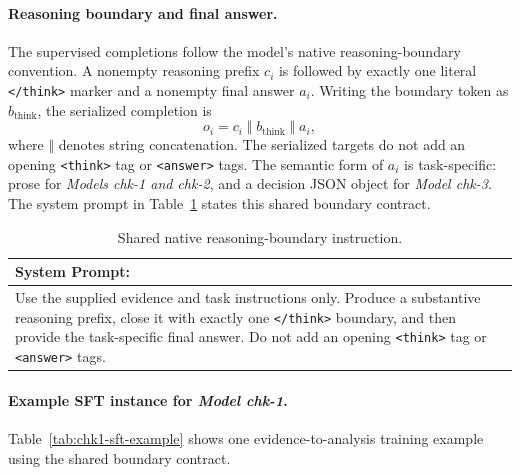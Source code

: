 \paragraph*{Reasoning boundary and final answer.}
The supervised completions follow the model's native reasoning-boundary
convention. A nonempty reasoning prefix $c_i$ is followed by exactly one
literal \texttt{</think>} marker and a nonempty final
answer $a_i$. Writing the boundary token as $b_{\mathrm{think}}$, the
serialized completion is
\begin{equation*}
    o_i=c_i\;\Vert\;b_{\mathrm{think}}\;\Vert\;a_i,
\end{equation*}
where $\Vert$ denotes string concatenation. The serialized targets do not add
an opening \texttt{<think>} tag or \texttt{<answer>} tags. The semantic form
of $a_i$ is task-specific: prose for \textit{Models chk-1 and chk-2},
and a decision JSON object for \textit{Model chk-3}. The system prompt in
Table~\ref{tab:ch2:system_prompt} states this shared boundary contract.


\begin{table}[htbp]
    \centering
    \footnotesize
    \begin{tabular}{@{}p{\textwidth}@{}}
    \toprule
    \textbf{System Prompt:} \\
    \midrule
      Use the supplied evidence and task instructions only. Produce a substantive reasoning prefix, close it with exactly one \texttt{</think>} boundary, and then provide the task-specific final answer. Do not add an opening \texttt{<think>} tag or \texttt{<answer>} tags. \\
    \bottomrule
    \end{tabular}
    \caption{Shared native reasoning-boundary instruction.}
    \label{tab:ch2:system_prompt}
\end{table}


\paragraph*{Example SFT instance for \textit{Model chk-1}.}
Table~\ref{tab:chk1-sft-example} shows one evidence-to-analysis training
example using the shared boundary contract.

